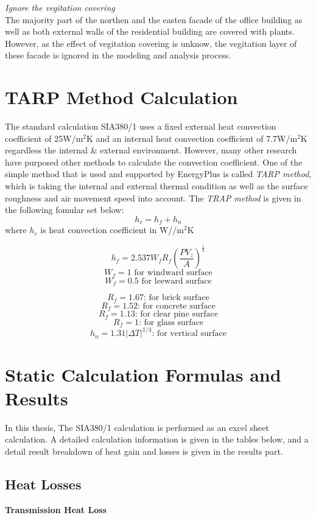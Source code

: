 \documentclass[a4paper, oneside]{discothesis}
\begin{document}
	\textit{Ignore the vegitation covering}\\
	The majority part of the northen and the easten facade of the office building as well as both external walls of the residential building are covered with plants. However, as the effect of vegitation covering is unknow, the vegitation layer of these facade is ignored in the modeling and analysis process.\\


\chapter{TARP Method Calculation}\label{sec:tarp}
	The standard calculation SIA380/1 uses a fixed external heat convection coefficient of 25W/m$^2$K and an internal heat convection coefficient of 7.7W/m$^2$K regardless the internal \& external environment. However, many other research have purposed other methods to calculate the convection coefficient. One of the simple method that is used and supported by EnergyPlus is called \textit{TARP method}, which is taking the internal and external thermal condition as well as the surface roughness and air movement speed into account. The \textit{TRAP method} is given in the following fomular set below: \\

	\[h_c = h_f + h_n\]
	where $h_c$ is heat convection coefficient in W//m$^2$K

	\[h_f = 2.537 W_f R_f \left(\frac{PV_z}{A}\right)^\frac{1}{2}\]
	\[W_f = 1  \text{   for windward surface}\]
	\[W_f = 0.5 \text{   for leeward surface}\]

	\[R_f = 1.67 \text{: for brick surface}\]
	\[R_f = 1.52 \text{: for concrete surface}\]
	\[R_f = 1.13 \text{: for clear pine surface}\]
	\[R_f = 1 \text{: for glass surface}\]
	\[h_n = 1.31 | \Delta T|^{1/3} \text{: for vertical surface}\]
	

\chapter{Static Calculation Formulas and Results}\label{sec:siacalculation}
	In this thesis, The SIA380/1 calculation is performed as an excel sheet calculation. A detailed calculation information is given in the tables below, and a detail result breakdown of heat gain and losses is given in the results part.
	\section{Heat Losses}
	\textbf{Transmission Heat Loss}\\
\end{document}
